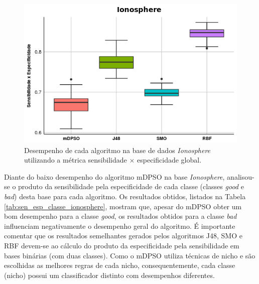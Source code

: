 \documentclass[
	12pt,				%
	openany,			%
	oneside,	
	a4paper,			%
	brazil,				%
	]{unimontes-ppgmsc-abntex2}
\begin{document}
\begin{figure}[!ht]
\centering
\includegraphics[scale=.7]{graficos/ionosphere}
\caption{Desempenho de cada algoritmo na base de dados {\em Ionosphere} utilizando a métrica sensibilidade $\times$ especificidade global.}
\label{fig:ionosphere}
\end{figure}

\begin{table}[!ht]
\setlength{\arrayrulewidth}{.2em}
\vspace{12pt}
\centering{}
\caption{p-valor medido para o produto da sensibilidade pela especificidade global de cada algoritmo na base de dados {\em Ionosphere}.}
\label{tab:pvalor_ionosphere}
\end{table}

Diante do baixo desempenho do algoritmo mDPSO na base \emph{Ionosphere}, analisou-se o produto da sensibilidade pela especificidade de cada classe  (classes {\em good} e {\em bad}) desta base para cada algoritmo. Os resultados obtidos, listados na Tabela \ref{tab:sen_esp_classe_ionosphere},  mostram que, apesar do mDPSO obter um bom desempenho para a classe {\em good}, os resultados obtidos para a classe {\em bad} influenciam negativamente o desempenho geral do algoritmo. É importante comentar que os resultados semelhantes gerados pelos algoritmos J48, SMO e RBF devem-se ao cálculo do produto da especificidade pela sensibilidade em bases binárias (com duas classes). Como o mDPSO utiliza técnicas de nicho e são escolhidas as melhores regras de cada nicho, consequentemente, cada classe (nicho) possui um classificador distinto com desempenhos diferentes. 
\end{document}

